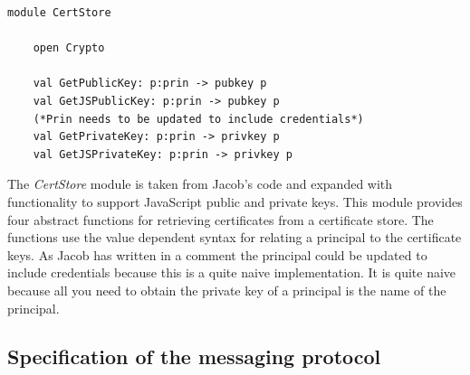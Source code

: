 \documentclass[twosided]{report}
\begin{document}
\begin{lstlisting}[style=fstar, caption={Abstract certificate store}]
	module CertStore
	
	open Crypto

	val GetPublicKey: p:prin -> pubkey p
	val GetJSPublicKey: p:prin -> pubkey p
	(*Prin needs to be updated to include credentials*)
	val GetPrivateKey: p:prin -> privkey p 
	val GetJSPrivateKey: p:prin -> privkey p
\end{lstlisting}

The \emph{CertStore} module is taken from Jacob's code and expanded with functionality to support JavaScript public and private keys. This module provides four abstract functions for retrieving certificates from a certificate store. The functions use the value dependent syntax for relating a principal to the certificate keys. As Jacob has written in a comment the principal could be updated to include credentials  because this is a quite naive implementation. It is quite naive because all you need to obtain the private key of a principal is the name of the principal.
\subsection{Specification of the messaging protocol}
\end{document}
